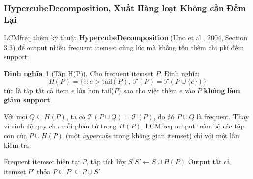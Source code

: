 \documentclass[12pt,a4paper]{article}
\theoremstyle{definition}
\newtheorem{definition}{Định nghĩa}[section]
\begin{document}


\subsubsection{HypercubeDecomposition, Xuất Hàng loạt Không cần Đếm Lại}

LCMfreq thêm kỹ thuật \textbf{HypercubeDecomposition} (Uno et al., 2004, Section 3.3) để output nhiều frequent itemset cùng lúc mà không tốn thêm chi phí đếm support:

\begin{definition}[Tập H(P)]
Cho frequent itemset $P$. Định nghĩa:
\[
    H(P) = \{e : e > \mathrm{tail}(P),\ \mathcal{T}(P) = \mathcal{T}(P \cup \{e\})\}
\]
tức là tập tất cả item $e$ lớn hơn tail($P$) sao cho việc thêm $e$ vào $P$ \textbf{không làm giảm support}.
\end{definition}

Với mọi $Q \subseteq H(P)$, ta có $\mathcal{T}(P \cup Q) = \mathcal{T}(P)$, do đó $P \cup Q$ là frequent. Thay vì sinh đệ quy cho mỗi phần tử trong $H(P)$, LCMfreq output toàn bộ các tập con của $P \cup H(P)$ (một \textit{hypercube} trong không gian itemset) chỉ với một lần kiểm tra.

\begin{algorithm}[H]
\caption{HypercubeDecomposition (Uno et al., 2004, Section 3.3)}
\label{alg:hypercube}
\begin{algorithmic}[1]
\Require Frequent itemset hiện tại $P$, tập tích lũy $S$
\State $S' \gets S \cup H(P)$
\State Output tất cả itemset $P'$ thỏa $P \subseteq P' \subseteq P \cup S'$
        \State {}
    \EndIf
\EndFor
\end{algorithmic}
\end{algorithm}
\end{document}
